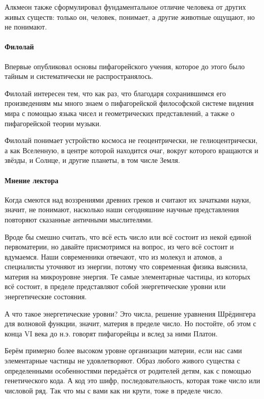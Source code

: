 Алкмеон также сформулировал фундаментальное отличие человека от других живых существ: только он, человек, понимает, а другие животные ощущают, но не понимают. 

\paragraph{Филолай}  Впервые опубликовал основы пифагорейского учения, которое до этого было тайным и систематически не распространялось. 

Филолай интересен тем, что как раз, что благодаря сохранившимся его произведениям мы много знаем о пифагорейской философской системе видения мира с помощью языка чисел и геометрических представлений, а также о пифагорейской теории музыки. 

Филолай понимает устройство космоса не геоцентрически, не гелиоцентрически, а как Вселенную, в центре которой находится очаг, вокруг которого вращаются и
звёзды, и Солнце, и другие планеты, в том числе Земля. 


\paragraph{Мнение лектора}
Когда смеются над воззрениями древних греков и считают их зачатками науки, значит, не понимают, насколько наши сегодняшние научные представления повторяют сказанные античными мыслителями. 

Вроде бы смешно считать, что всё есть число или всё состоит из некой единой первоматерии, но давайте присмотримся на вопрос, из чего всё состоит и вдумаемся.  Наши современники отвечают, что из молекул и атомов, а специалисты уточняют из энергии, потому что современная физика выяснила, материя на микроуровне энергия. Те самые элементарные частицы, из которых всё состоит, в пределе представляют собой энергетические уровни или энергетические состояния. 

А что такое энергетические уровни? Это числа, решение уравнения Шрёдингера для волновой функции, значит, материя в пределе число. Но постойте, об этом с конца VI века до н.э. говорят пифагорейцы и вслед за ними Платон. 

Берём примерно более высоком уровне организации материи, если нас сами элементарные частицы не удовлетворяют. Образ любого живого существа с определенными особенностями передаётся от родителей детям, как с помощью генетического кода. А код это шифр, последовательность, которая тоже число или числовой ряд. Так что мы с вами как ни крути, тоже в пределе число. 

